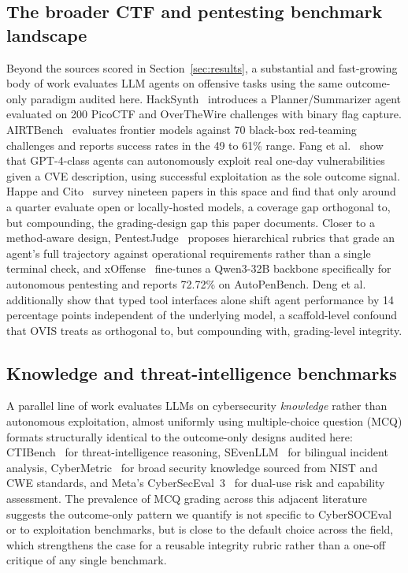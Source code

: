 \documentclass[10pt,twocolumn]{article}
\begin{document}
\subsection{The broader CTF and pentesting benchmark landscape}
Beyond the sources scored in Section~\ref{sec:results}, a substantial and
fast-growing body of work evaluates LLM agents on offensive tasks using
the same outcome-only paradigm audited here. HackSynth~\cite{hacksynth2024}
introduces a Planner/Summarizer agent evaluated on 200 PicoCTF and
OverTheWire challenges with binary flag capture. AIRTBench~\cite{airtbench2025}
evaluates frontier models against 70 black-box red-teaming challenges
and reports success rates in the 49 to 61\% range. Fang et
al.~\cite{fang2024oneday} show that GPT-4-class agents can autonomously
exploit real one-day vulnerabilities given a CVE description, using
successful exploitation as the sole outcome signal. Happe and
Cito~\cite{happe2025survey} survey nineteen papers in this space and
find that only around a quarter evaluate open or locally-hosted models,
a coverage gap orthogonal to, but compounding, the grading-design gap
this paper documents. Closer to a method-aware design, PentestJudge~\cite{pentestjudge2025}
proposes hierarchical rubrics that grade an agent's full trajectory
against operational requirements rather than a single terminal check,
and xOffense~\cite{xoffense2025} fine-tunes a Qwen3-32B backbone
specifically for autonomous pentesting and reports 72.72\% on
AutoPenBench. Deng et al.~\cite{deng2025pentest} additionally show that
typed tool interfaces alone shift agent performance by 14 percentage
points independent of the underlying model, a scaffold-level confound
that OVIS treats as orthogonal to, but compounding with, grading-level
integrity.

\subsection{Knowledge and threat-intelligence benchmarks}
A parallel line of work evaluates LLMs on cybersecurity
\emph{knowledge} rather than autonomous exploitation, almost uniformly
using multiple-choice question (MCQ) formats structurally identical to
the outcome-only designs audited here: CTIBench~\cite{ctibench2024} for
threat-intelligence reasoning, SEvenLLM~\cite{sevenllm2024} for
bilingual incident analysis, CyberMetric~\cite{cybermetric2024} for
broad security knowledge sourced from NIST and CWE standards, and Meta's
CyberSecEval~3~\cite{cyberseceval3_2024} for dual-use risk and
capability assessment. The prevalence of MCQ grading across this
adjacent literature suggests the outcome-only pattern we quantify is not
specific to CyberSOCEval or to exploitation benchmarks, but is close to
the default choice across the field, which strengthens the case for a
reusable integrity rubric rather than a one-off critique of any single
benchmark.
\end{document}
